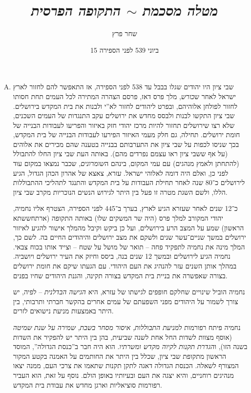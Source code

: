 \documentclass[]{article}
\author{שחר פרץ}
\title{\textit{מטלה מסכמת $\sim$ התקופה הפרסית}}
\date{15 ביוני 539 לפני הספירה}
\begin{document}
    \maketitle
    \begin{enumerate}[A.]
        \item
        שבי ציון היו יהודים שגלו בבבל עד 538 לפני הספירה, אז התאפשר להם לחזור לארץ ישראל לאחר ש\textit{כורש}, מלך פרס דאז, פרסם הצהרה המתירה לכל העמים תחת חסותו לחזור לפולחן אלוהיהם, ובפרט ליהודים לחזור לא''י ולבנות את בית המקדש בירושלים. שבי ציון התקשו לבנות ולבסס מחדש את ירושלים עקב התנגדות של העמים השכנים, שלא רצו שירושלים תחזור להיות מרכז יהודי חזק באיזור והפריעו לעבודות הבנייה של חומת ירושלים. תחילה, גם חלק מעמי האיזור הפירעו לעבודות הבנייה של בית המקדש, בכך שניסו לכפות על שבי ציון את התערבותם בבנייה בטענה שהם מכירים את אלוהים (על אף ששבי ציון ראו עצמם נפרדים מהם). באותה העת שבי ציון החלו להתבולל (להתחתן ולאמץ מנהגים) עם עמי המקום, בינהם ה\textit{שומרונים}, שכבר נמצאו במקום עוד לפני כן, ואלם היה דומה לאלוהי ישראל. \textit{עזרא}, צאצא של אהרון הכהן הגדול, הגיע לירושלים כ־80 שנה לאחר תחילת העבודות על בית המקדש והתנגד לתהליכי ההתבוללות הללו, ולשם השגת מטרה זו פעל בין היתר לגירוש הנשים הנוכריות מקרב שבי ציון. 
        
        כ־12 שנים לאחר שעזרא הגיע לארץ, בערך ב־445 לפני הספירה, הצטרף אליו נחמיה, יהודי המקורב למלך פרס (היה שר המשקים שלו) באותה התקופה (ארתחששתא הראשון) שמע על המצב הרע בירושלים, ועל כן ביקש וקיבל מהמלך אישור להגיע לאיזור ירושלים במשך שניים־עשר שנים ולשקם את מצב ירושלים והיהודים החיים בה. לשם כך, המלך מינה את נחמיה לתפקיד פחה – תואר של מושל על שטח – וצייד אותו בכוח צבאי. נחמיה הגיע לירושלים ובמשך 12 שנים בנה, ביסס וחיזק את העיר ירושלים ויושביה. במהלך אותן השנים עזר להנהיג את העם היהודי. עם הגעתו שיקם את חומת ירושלים בצורה שאפשרה את בניית בית המקדש בצורה תקינה, והגנת היהודים שחיו בפנים. 
        
        נחמיה הוביל שינויים שחלקם חופפים לגישתו של עזרא, היא \textit{הגישה הבדלנית} – לפיה, יש צורך לשמור על היהודים מפני השפעתם של עמים אחרים בהקשר חברתי ותרבותי, בין היתר באמצעות מניעת נישואים לזרים. 
        
        נחמיה פיתח רפורמות ל\textit{מניעת התבוללות}, \textit{איסור מסחר בשבת}, \textit{שמירה על שנת שמיטה} (אוסף מצוות לשדות החל אחת לשנה שביעית, בהן בין היתר יש להפקיר את השדות בשנה הזו), ו\textit{הגדרת תקנות לקיוה מקדש ומשרתיו}. הוא היה חבר ב''כנסת הגדולה'', המוסד הראשון מתקופת שבי ציון, שכלל בין היתר את החותמים על האמנה בקטע המקור המצורף לשאלה. הכנסת הגדולה דאגה לתקן תקנות שתאמו את צרכי העם, ממנה יצאו מנהיגים רוחניים, והיא יצגה את העם ובעיותיו באופן הולם. נוסף על זאת, הוא העביר רפורמות סוציאליות וארגן מחדש את עבודת בית המקדש. 
        

\end{enumerate}
\end{document}
